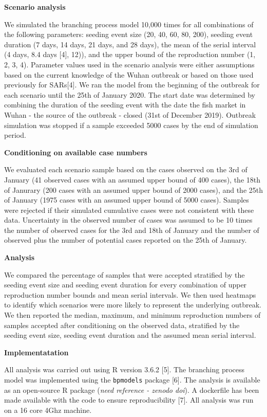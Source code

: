 \documentclass[]{article}
\begin{document}
\textbf{Scenario analysis}

We simulated the branching process model 10,000 times for all
combinations of the following parameters: seeding event size (20, 40,
60, 80, 200), seeding event duration (7 days, 14 days, 21 days, and 28
days), the mean of the serial interval (4 days, 8.4 days {[}4{]}, 12)),
and the upper bound of the reproduction number (1, 2, 3, 4). Parameter
values used in the scenario analysis were either assumptions based on
the current knowledge of the Wuhan outbreak or based on those used
previously for SARs{[}4{]}. We ran the model from the beginning of the
outbreak for each scenario until the 25th of January 2020. The start
date was determined by combining the duration of the seeding event with
the date the fish market in Wuhan - the source of the outbreak - closed
(31st of December 2019). Outbreak simulation was stopped if a sample
exceeded 5000 cases by the end of simulation period.

\textbf{Conditioning on available case numbers}

We evaluated each scenario sample based on the cases observed on the 3rd
of January (41 observed cases with an assumed upper bound of 400 cases),
the 18th of Janurary (200 cases with an assumed upper bound of 2000
cases), and the 25th of January (1975 cases with an assumed upper bound
of 5000 cases). Samples were rejected if their simulated cumulative
cases were not consistent with these data. Uncertainty in the observed
number of cases was assumed to be 10 times the number of observed cases
for the 3rd and 18th of January and the number of observed plus the
number of potential cases reported on the 25th of January.

\textbf{Analysis}

We compared the percentage of samples that were accepted stratified by
the seeding event size and seeding event duration for every combination
of upper reproduction number bounds and mean serial intervals. We then
used heatmaps to identify which scenarios were more likely to represent
the underlying outbreak. We then reported the median, maximum, and
minimum reproduction numbers of samples accepted after conditioning on
the observed data, stratified by the seeding event size, seeding event
duration and the assumed mean serial interval.

\textbf{Implementatation}

All analysis was carried out using R version 3.6.2 {[}5{]}. The
branching process model was implemented using the \texttt{bpmodels}
package {[}6{]}. The analysis is available as an open-source R package
(\emph{need reference - zenodo doi}). A dockerfile has been made
available with the code to ensure reproducibility {[}7{]}. All analysis
was run on a 16 core 4Ghz machine.
\end{document}
